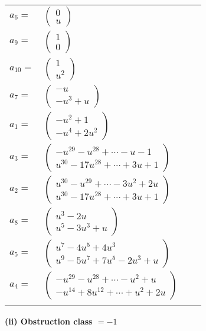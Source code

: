 \documentclass[1p]{elsarticle_modified}
\theoremstyle{definition}
\begin{document}
\begin{tabular}{m{7pt} m{180pt} m{7pt} m{180pt} }
\flushright $a_{6}=$&$\begin{pmatrix}0\\u\end{pmatrix}$ \\
\flushright $a_{9}=$&$\begin{pmatrix}1\\0\end{pmatrix}$ \\
\flushright $a_{10}=$&$\begin{pmatrix}1\\u^2\end{pmatrix}$ \\
\flushright $a_{7}=$&$\begin{pmatrix}- u\\- u^3+u\end{pmatrix}$ \\
\flushright $a_{1}=$&$\begin{pmatrix}- u^2+1\\- u^4+2 u^2\end{pmatrix}$ \\
\flushright $a_{3}=$&$\begin{pmatrix}- u^{29}- u^{28}+\cdots- u-1\\u^{30}-17 u^{28}+\cdots+3 u+1\end{pmatrix}$ \\
\flushright $a_{2}=$&$\begin{pmatrix}u^{30}- u^{29}+\cdots-3 u^2+2 u\\u^{30}-17 u^{28}+\cdots+3 u+1\end{pmatrix}$ \\
\flushright $a_{8}=$&$\begin{pmatrix}u^3-2 u\\u^5-3 u^3+u\end{pmatrix}$ \\
\flushright $a_{5}=$&$\begin{pmatrix}u^7-4 u^5+4 u^3\\u^9-5 u^7+7 u^5-2 u^3+u\end{pmatrix}$ \\
\flushright $a_{4}=$&$\begin{pmatrix}- u^{29}- u^{28}+\cdots- u^2+u\\- u^{14}+8 u^{12}+\cdots+u^2+2 u\end{pmatrix}$\\&\end{tabular}
\flushleft \textbf{(ii) Obstruction class $= -1$}\\~\\
\end{document}
